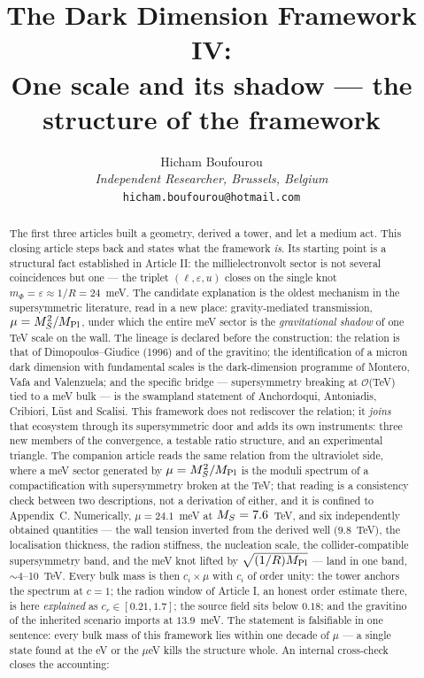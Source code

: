 
\graphicspath{{figures/}{../figures/}}
\title{\textbf{The Dark Dimension Framework IV:\\ One scale and its shadow --- the structure of the framework}}
\author{Hicham Boufourou\\ \small\textit{Independent Researcher, Brussels, Belgium}\\ \small\texttt{hicham.boufourou@hotmail.com}}
\maketitle
\begin{abstract}
\noindent The first three articles built a geometry, derived a tower, and let a medium act. This closing article steps back and states what the framework \emph{is}. Its starting point is a structural fact established in Article II: the millielectronvolt sector is not several coincidences but one --- the triplet $(\ell,\varepsilon,u)$ closes on the single knot $m_{\Phi}=\varepsilon\approx1/R=24$~meV. The candidate explanation is the oldest mechanism in the supersymmetric literature, read in a new place: gravity-mediated transmission, $\mu=M_S^{2}/M_{\rm Pl}$, under which the entire meV sector is the \emph{gravitational shadow} of one TeV scale on the wall. The lineage is declared before the construction: the relation is that of Dimopoulos--Giudice (1996) and of the gravitino; the identification of a micron dark dimension with fundamental scales is the dark-dimension programme of Montero, Vafa and Valenzuela; and the specific bridge --- supersymmetry breaking at $\mathcal{O}$(TeV) tied to a meV bulk --- is the swampland statement of Anchordoqui, Antoniadis, Cribiori, L\"ust and Scalisi. This framework does not rediscover the relation; it \emph{joins} that ecosystem through its supersymmetric door and adds its own instruments: three new members of the convergence, a testable ratio structure, and an experimental triangle. The companion article reads the same relation from the ultraviolet side, where a meV sector generated by $\mu=M_S^{2}/M_{\rm Pl}$ is the moduli spectrum of a compactification with supersymmetry broken at the TeV; that reading is a consistency check between two descriptions, not a derivation of either, and it is confined to Appendix~C. Numerically, $\mu=24.1$~meV at $M_S=7.6$~TeV, and six independently obtained quantities --- the wall tension inverted from the derived well ($9.8$~TeV), the localisation thickness, the radion stiffness, the nucleation scale, the collider-compatible supersymmetry band, and the meV knot lifted by $\sqrt{(1/R)M_{\rm Pl}}$ --- land in one band, $\sim$4--10~TeV. Every bulk mass is then $c_{i}\times\mu$ with $c_{i}$ of order unity: the tower anchors the spectrum at $c=1$; the radion window of Article I, an honest order estimate there, is here \emph{explained} as $c_{r}\in[0.21,1.7]$; the source field sits below $0.18$; and the gravitino of the inherited scenario imports at $13.9$~meV. The statement is falsifiable in one sentence: every bulk mass of this framework lies within one decade of $\mu$ --- a single state found at the eV or the $\mu$eV kills the structure whole. An internal cross-check closes the accounting: 
\end{abstract}
